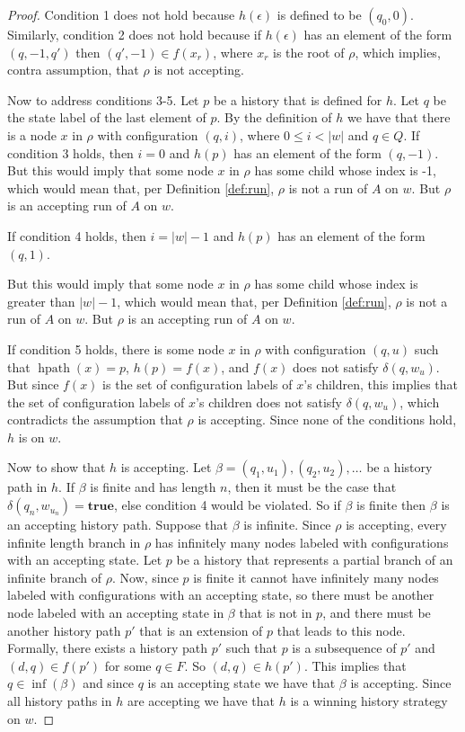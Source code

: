 \documentclass[10pt,a4paper]{amsart}
\theoremstyle{plain}
\theoremstyle{definition}
\theoremstyle{definition}
\DeclareMathOperator{\?}{?}
\DeclareMathOperator{\mypath}{hpath}
\begin{document}
\begin{proof}
    Condition 1 does not hold because $h(\epsilon)$ is defined to be $(q_0,0)$. Similarly, condition 2 does not hold because
    if $h(\epsilon)$ has an element of the form $(q,-1,q')$ then $(q',-1) \in f(x_r)$, where $x_r$ is the root of $\rho$,
    which implies, contra assumption, that $\rho$ is not accepting.

    Now to address conditions 3-5. Let $p$ be a history that is defined for $h$. Let $q$ be the state label of the last element of $p$.
    By the definition of $h$ we have that there is a node $x$ in $\rho$ with configuration $(q,i)$, where $0 \leq i < |w|$ and $q \in Q$.
    If condition 3 holds, then $i = 0$ and $h(p)$ has an element of the form $(q,-1)$. But this would imply that some node $x$ in $\rho$
    has some child whose index is -1, which would mean that, per Definition \ref{def:run}, $\rho$ is not a run of $A$ on $w$. But $\rho$ is an accepting run of $A$ on $w$.

    If condition 4 holds, then $i = |w| - 1$ and $h(p)$
    has an element of the form $(q,1)$.

    But this would imply that some node $x$ in $\rho$ has some child whose index is greater than $|w| - 1$, which would mean that, per Definition \ref{def:run}, $\rho$ is not a run of $A$ on $w$. But $\rho$ is an accepting run of $A$ on $w$.

    If condition 5 holds, there is some node $x$ in $\rho$ with configuration
    $(q,u)$ such that
    $\mypath(x) = p$, $h(p) = f(x)$, and $f(x)$ does not satisfy $\delta(q,w_u)$. But since $f(x)$ is the set of configuration labels of
    $x$'s children, this implies that the set of configuration labels of $x$'s children does not satisfy $\delta(q,w_u)$, which
    contradicts the assumption that $\rho$ is accepting. Since none of the conditions hold, $h$ is on $w$.

    Now to show that $h$ is accepting. Let $\beta = (q_1,u_1),(q_2,u_2),\ldots$ be a history path in $h$. If $\beta$ is finite and has length $n$, then it
    must be the case that $\delta(q_n, w_{u_n}) = \textbf{true}$, else condition 4 would be violated. So if
    $\beta$ is finite then $\beta$ is an accepting history path. Suppose that $\beta$ is infinite.
    Since $\rho$ is accepting, every
    infinite length branch in $\rho$ has infinitely many nodes labeled with configurations with an accepting state.
    Let $p$ be a history that represents a partial branch of an infinite branch of $\rho$. Now, since $p$ is finite
    it cannot have infinitely many nodes labeled with configurations with an accepting state, so there must be
    another node labeled with an accepting state in $\beta$ that is not in $p$, and there must be another history path $p'$
    that is an extension of $p$ that leads to this node. Formally, there exists a history path $p'$ such that $p$ is a subsequence
    of $p'$ and $(d,q) \in f(p')$ for some $q \in F$. So $(d,q) \in h(p')$. This implies that $q \in \inf(\beta)$ and since
    $q$ is an accepting state we have that $\beta$ is accepting. Since all history paths in $h$ are accepting we have that $h$ is a winning history strategy on $w$.




\end{proof}
\end{document}
